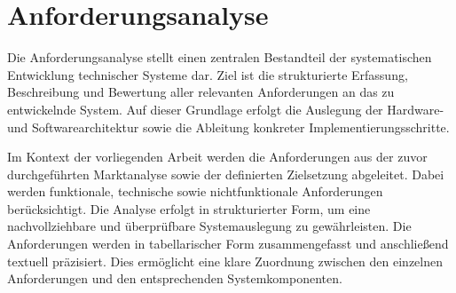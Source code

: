 \chapter{Anforderungsanalyse}
Die Anforderungsanalyse stellt einen zentralen Bestandteil der systematischen Entwicklung technischer Systeme dar.
Ziel ist die strukturierte Erfassung, Beschreibung und Bewertung aller relevanten Anforderungen an das zu entwickelnde System.
Auf dieser Grundlage erfolgt die Auslegung der Hardware- und Softwarearchitektur sowie die Ableitung konkreter Implementierungsschritte.

Im Kontext der vorliegenden Arbeit werden die Anforderungen aus der zuvor durchgeführten Marktanalyse sowie der definierten Zielsetzung abgeleitet.
Dabei werden funktionale, technische sowie nichtfunktionale Anforderungen berücksichtigt.
Die Analyse erfolgt in strukturierter Form, um eine nachvollziehbare und überprüfbare Systemauslegung zu gewährleisten.
Die Anforderungen werden in tabellarischer Form zusammengefasst und anschließend textuell präzisiert.
Dies ermöglicht eine klare Zuordnung zwischen den einzelnen Anforderungen und den entsprechenden Systemkomponenten.